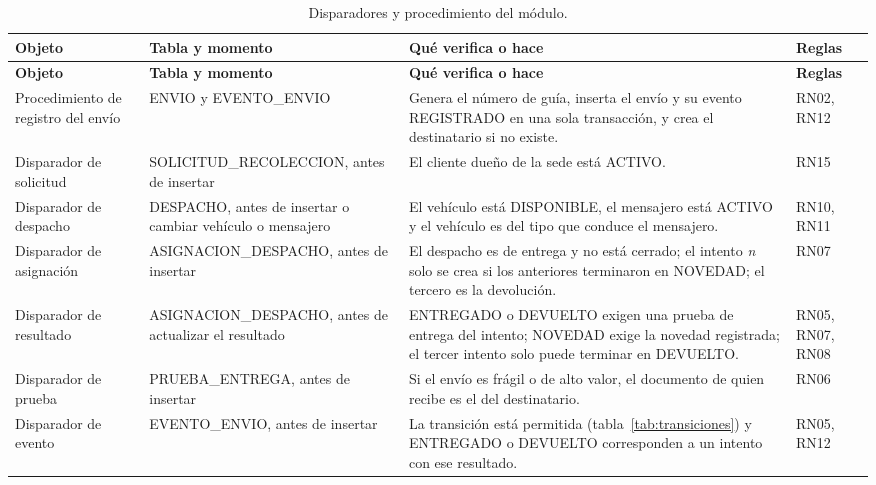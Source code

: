 {\singlespacing\small
\begin{longtable}{L{4.0cm} L{3.4cm} L{5.4cm} L{1.4cm}}
\caption{Disparadores y procedimiento del módulo.}
\label{tab:disparadores}\\
\toprule
\textbf{Objeto} & \textbf{Tabla y momento} & \textbf{Qué verifica o hace} & \textbf{Reglas} \\
\midrule
\endfirsthead
\toprule
\textbf{Objeto} & \textbf{Tabla y momento} & \textbf{Qué verifica o hace} & \textbf{Reglas} \\
\midrule
\endhead
\bottomrule
\endfoot
Procedimiento de registro del envío & ENVIO y EVENTO\_ENVIO & Genera el número de guía, inserta el envío y su evento REGISTRADO en una sola transacción, y crea el destinatario si no existe. & RN02, RN12 \\
Disparador de solicitud & SOLICITUD\_RECOLECCION, antes de insertar & El cliente dueño de la sede está ACTIVO. & RN15 \\
Disparador de despacho & DESPACHO, antes de insertar o cambiar vehículo o mensajero & El vehículo está DISPONIBLE, el mensajero está ACTIVO y el vehículo es del tipo que conduce el mensajero. & RN10, RN11 \\
Disparador de asignación & ASIGNACION\_DESPACHO, antes de insertar & El despacho es de entrega y no está cerrado; el intento \textit{n} solo se crea si los anteriores terminaron en NOVEDAD; el tercero es la devolución. & RN07 \\
Disparador de resultado & ASIGNACION\_DESPACHO, antes de actualizar el resultado & ENTREGADO o DEVUELTO exigen una prueba de entrega del intento; NOVEDAD exige la novedad registrada; el tercer intento solo puede terminar en DEVUELTO. & RN05, RN07, RN08 \\
Disparador de prueba & PRUEBA\_ENTREGA, antes de insertar & Si el envío es frágil o de alto valor, el documento de quien recibe es el del destinatario. & RN06 \\
Disparador de evento & EVENTO\_ENVIO, antes de insertar & La transición está permitida (tabla~\ref{tab:transiciones}) y ENTREGADO o DEVUELTO corresponden a un intento con ese resultado. & RN05, RN12 \\
\end{longtable}
\par}

